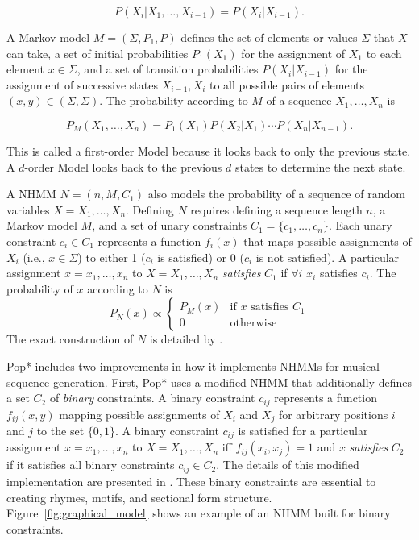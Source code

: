 \documentclass[phd,electronic,oneside,twosidetoc,letterpaper,chaptercenter,parttop,lof,lot]{byumsphd}
\begin{document}
\[
P(X_i|X_1,\dots, X_{i-1}) = P(X_i|X_{i-1}).
\]

\noindent A Markov model $M = (\Sigma, P_1, P)$ defines the set of elements or values $\Sigma$ that $X$ can take, a set of initial probabilities $P_1(X_1)$ for the assignment of $X_1$ to each element $x \in \Sigma$, and a set of transition probabilities $P(X_i|X_{i-1})$ for the assignment of successive states $X_{i-1},X_i$ to all possible pairs of elements $(x,y)\in (\Sigma,\Sigma)$. The probability according to $M$ of a sequence $X_1,\dots,X_n$ is

\[
P_M(X_1,\dots,X_n) = P_1(X_1)P(X_2|X_1)\cdots P(X_n|X_{n-1}).
\]

This is called a first-order Model because it looks back to only the previous state. A $d$-order Model looks back to the previous $d$ states to determine the next state.

A NHMM $N = (n, M, C_1)$ also models the probability of a sequence of random variables $X=X_1,\dots,X_n$. Defining $N$ requires defining a sequence length $n$, a Markov model $M$, and a set of unary constraints $C_1=\{c_1,\dots,c_n\}$. Each unary constraint $c_i\in C_1$ represents a function $f_i(x)$ that maps possible assignments of $X_i$ (i.e., $x\in\Sigma$) to either 1 ($c_i$ is satisfied) or 0 ($c_i$ is not satisfied). A particular assignment $x=x_1,\dots,x_n$ to $X=X_1,\dots,X_n$ \textit{satisfies} $C_1$ if $\forall i$ $x_i$ satisfies $c_i$. The probability of $x$ according to $N$ is
\[
P_{N}(x) \propto 
\begin{cases}
P_M(x) & \text{if } x \text{ satisfies } {C_1} \\
0 & \text{otherwise}
\end{cases}
\]
\noindent The exact construction of $N$ is detailed by \citeauthor{pachet2011finite} \cite{pachet2011finite}. 

Pop* includes two improvements in how it implements NHMMs for musical sequence generation. First, Pop* uses a modified NHMM that additionally defines a set ${C_2}$ of \textit{binary} constraints. A binary constraint $c_{ij}$ represents a function $f_{ij}(x,y)$ mapping possible assignments of $X_i$ and $X_j$ for arbitrary positions $i$ and $j$ to the set $\{0,1\}$. A binary constraint $c_{ij}$ is satisfied for a particular assignment $x=x_1,\dots,x_n$ to $X=X_1,\dots,X_n$ iff $f_{ij}(x_i,x_j)=1$ and $x$ \textit{satisfies} $C_2$ if it satisfies all binary constraints $c_{ij} \in C_2$. The details of this modified implementation are presented in \cite{bodily2018relational}. These binary constraints are essential to creating rhymes, motifs, and sectional form structure. Figure~\ref{fig:graphical_model} shows an example of an NHMM built for binary constraints.
\end{document}
